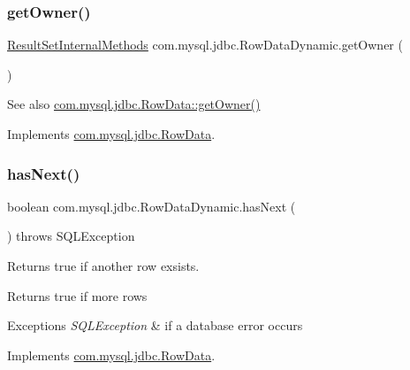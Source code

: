 \subsubsection{\texorpdfstring{get\+Owner()}{getOwner()}}
{\footnotesize\ttfamily \mbox{\hyperlink{interfacecom_1_1mysql_1_1jdbc_1_1_result_set_internal_methods}{Result\+Set\+Internal\+Methods}} com.\+mysql.\+jdbc.\+Row\+Data\+Dynamic.\+get\+Owner (\begin{DoxyParamCaption}{ }\end{DoxyParamCaption})}

\begin{DoxySeeAlso}{See also}
\mbox{\hyperlink{interfacecom_1_1mysql_1_1jdbc_1_1_row_data_adb65eef9f8713ed4c3a1eb67eafaaf86}{com.\+mysql.\+jdbc.\+Row\+Data\+::get\+Owner()}} 
\end{DoxySeeAlso}


Implements \mbox{\hyperlink{interfacecom_1_1mysql_1_1jdbc_1_1_row_data_adb65eef9f8713ed4c3a1eb67eafaaf86}{com.\+mysql.\+jdbc.\+Row\+Data}}.

\mbox{\label{classcom_1_1mysql_1_1jdbc_1_1_row_data_dynamic_a4a34ec97dbfebd279d8008c69316b5be}} 
\subsubsection{\texorpdfstring{has\+Next()}{hasNext()}}
{\footnotesize\ttfamily boolean com.\+mysql.\+jdbc.\+Row\+Data\+Dynamic.\+has\+Next (\begin{DoxyParamCaption}{ }\end{DoxyParamCaption}) throws S\+Q\+L\+Exception}

Returns true if another row exsists.

\begin{DoxyReturn}{Returns}
true if more rows 
\end{DoxyReturn}

\begin{DoxyExceptions}{Exceptions}
{\em S\+Q\+L\+Exception} & if a database error occurs \\
\hline
\end{DoxyExceptions}


Implements \mbox{\hyperlink{interfacecom_1_1mysql_1_1jdbc_1_1_row_data_a630ce5b4cd86f8b4d7f71548797c4c16}{com.\+mysql.\+jdbc.\+Row\+Data}}.

